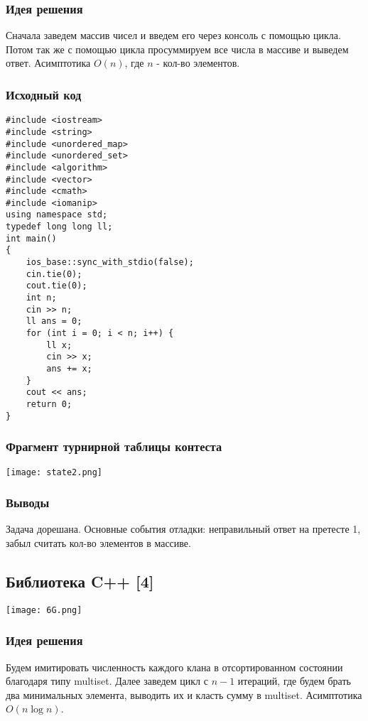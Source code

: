 \documentclass[12pt]{article}
\begin{document}
\subsubsection*{Идея решения}
Сначала заведем массив чисел и введем его через консоль с помощью цикла. Потом так же с помощью цикла просуммируем все числа в массиве и выведем ответ. Асимптотика $O(n)$, где $n$ - кол-во элементов. 
\subsubsection*{Исходный код}
\begin{lstlisting}
#include <iostream>
#include <string>
#include <unordered_map>
#include <unordered_set>
#include <algorithm>
#include <vector>
#include <cmath>
#include <iomanip>
using namespace std;
typedef long long ll;
int main()
{
	ios_base::sync_with_stdio(false);
	cin.tie(0);
	cout.tie(0);
	int n;
	cin >> n;
	ll ans = 0;
	for (int i = 0; i < n; i++) {
		ll x;
		cin >> x;
		ans += x;
	}
	cout << ans;
	return 0;
}
\end{lstlisting}
\subsubsection*{Фрагмент турнирной таблицы контеста}
\begin{center}
\texttt{[image: state2.png]}\newline\noindent
\end{center}

\subsubsection*{Выводы}
Задача дорешана. Основные события отладки: неправильный ответ на претесте 1, забыл считать кол-во элементов в массиве.
\subsection*{Библиотека C++ [4]}
\begin{center}
\texttt{[image: 6G.png]}
\end{center}
\subsubsection*{Идея решения}
Будем имитировать численность каждого клана в отсортированном состоянии благодаря типу multiset. Далее заведем цикл с $n-1$ итераций, где будем брать два минимальных элемента, выводить их и класть сумму в multiset. Асимптотика  $O(n\log{}n)$.
\end{document}
